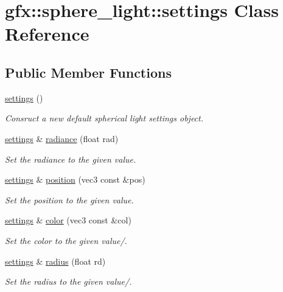 \hypertarget{classgfx_1_1sphere__light_1_1settings}{\section{gfx\-:\-:sphere\-\_\-light\-:\-:settings Class Reference}
\label{classgfx_1_1sphere__light_1_1settings}
}
\subsection*{Public Member Functions}
\begin{DoxyCompactItemize}
\item 
\hyperlink{classgfx_1_1sphere__light_1_1settings_a69c6f021eed638b821b6153275eb87bb}{settings} ()
\begin{DoxyCompactList}\small\item\em Consruct a new default spherical light settings object. \end{DoxyCompactList}\item 
\hyperlink{classgfx_1_1sphere__light_1_1settings}{settings} \& \hyperlink{classgfx_1_1sphere__light_1_1settings_a64e68a967c04fa9d7c4799cdd29a6fb6}{radiance} (float rad)
\begin{DoxyCompactList}\small\item\em Set the radiance to the given value. \end{DoxyCompactList}\item 
\hyperlink{classgfx_1_1sphere__light_1_1settings}{settings} \& \hyperlink{classgfx_1_1sphere__light_1_1settings_a77a31afb6f62b8a7f95199db309bc6b0}{position} (vec3 const \&pos)
\begin{DoxyCompactList}\small\item\em Set the position to the given value. \end{DoxyCompactList}\item 
\hyperlink{classgfx_1_1sphere__light_1_1settings}{settings} \& \hyperlink{classgfx_1_1sphere__light_1_1settings_a9f11ea555ce92baa6044e3a1a7a25db5}{color} (vec3 const \&col)
\begin{DoxyCompactList}\small\item\em Set the color to the given value/. \end{DoxyCompactList}\item 
\hyperlink{classgfx_1_1sphere__light_1_1settings}{settings} \& \hyperlink{classgfx_1_1sphere__light_1_1settings_ab9a71df2bb3a674fa8420fa5ae55a6d2}{radius} (float rd)
\begin{DoxyCompactList}\small\item\em Set the radius to the given value/. \end{DoxyCompactList}\end{DoxyCompactItemize}
